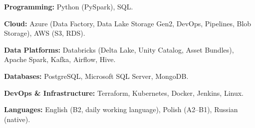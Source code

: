 
\textbf{Programming:} Python (PySpark), SQL.

\textbf{Cloud:} Azure (Data Factory, Data Lake Storage Gen2, DevOps, Pipelines, Blob Storage), AWS (S3, RDS).

\textbf{Data Platforms:} Databricks (Delta Lake, Unity Catalog, Asset Bundles), Apache Spark, Kafka, Airflow, Hive.

\textbf{Databases:} PostgreSQL, Microsoft SQL Server, MongoDB.

\textbf{DevOps \& Infrastructure:} Terraform, Kubernetes, Docker, Jenkins, Linux.

\textbf{Languages:} English (B2, daily working language), Polish (A2--B1), Russian (native).
